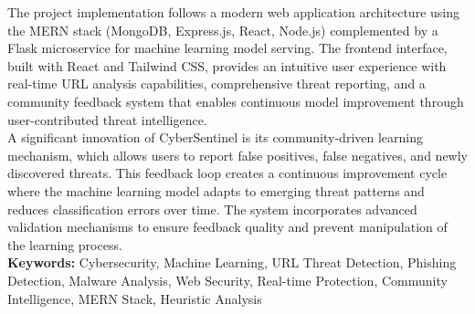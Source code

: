 \documentclass[12pt,a4paper,openany]{report}
\begin{document}
	The project implementation follows a modern web application architecture using the MERN stack (MongoDB, Express.js, React, Node.js) complemented by a Flask microservice for machine learning model serving. The frontend interface, built with React and Tailwind CSS, provides an intuitive user experience with real-time URL analysis capabilities, comprehensive threat reporting, and a community feedback system that enables continuous model improvement through user-contributed threat intelligence.\\
	
	A significant innovation of CyberSentinel is its community-driven learning mechanism, which allows users to report false positives, false negatives, and newly discovered threats. This feedback loop creates a continuous improvement cycle where the machine learning model adapts to emerging threat patterns and reduces classification errors over time. The system incorporates advanced validation mechanisms to ensure feedback quality and prevent manipulation of the learning process. \\
	
	
	
	\textbf{Keywords:} Cybersecurity, Machine Learning, URL Threat Detection, Phishing Detection, Malware Analysis, Web Security, Real-time Protection, Community Intelligence, MERN Stack, Heuristic Analysis
	
	\newpage
	\tableofcontents
	
	
	\newpage
	\listoffigures
	
	\newpage
	\listoftables
	
	
	
	

	
	
	

	
	
	
	
	\printbibliography
	
	

	
	
\end{document}
